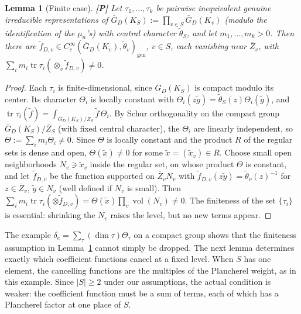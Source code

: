 \documentclass[12pt]{article}
\newcommand{\ov}[1]{\overline{#1}}
\newcommand{\gen}{\mathrm{gen}}
\newcommand{\tr}{\operatorname{tr}}
\newcommand{\vol}{\operatorname{vol}}
\newcommand{\Zb}{\ov{Z}}
\newcommand{\GDb}{\ov{G}_D}
\newcommand{\Pv}{\textbf{[P]}}
\theoremstyle{plain}
\newtheorem{lemma}[theorem]{Lemma}
\theoremstyle{definition}
\begin{document}
\begin{lemma}[Finite case]\label{lem:noncancel}\Pv
Let $\tau_1,\dots,\tau_k$ be pairwise inequivalent genuine irreducible representations of $\GDb(K_S):=\prod_{v\in S}\GDb(K_v)$ (modulo the identification of the $\mu_n$'s) with central character $\tilde\theta_S$, and let $m_1,\dots,m_k>0$. Then there are $\tilde f_{D,v}\in C_c^\infty(\GDb(K_v),\tilde\theta_v)_\gen$, $v\in S$, each vanishing near $\Zb_v$, with $\sum_im_i\tr\tau_i(\otimes_v\tilde f_{D,v})\ne0$.
\end{lemma}
\begin{proof}
Each $\tau_i$ is finite-dimensional, since $\GDb(K_S)$ is compact modulo its center. Its character $\Theta_i$ is locally constant with $\Theta_i(z\tilde g)=\tilde\theta_S(z)\Theta_i(\tilde g)$, and $\tr\tau_i(\tilde f)=\int_{\GDb(K_S)/\Zb_S}\tilde f\,\Theta_i$. By Schur orthogonality on the compact group $\GDb(K_S)/\Zb_S$ (with fixed central character), the $\Theta_i$ are linearly independent, so $\Theta:=\sum_im_i\Theta_i\ne0$. Since $\Theta$ is locally constant and the product $R$ of the regular sets is dense and open, $\Theta(\tilde x)\ne0$ for some $\tilde x=(\tilde x_v)\in R$. Choose small open neighborhoods $N_v\ni\tilde x_v$ inside the regular set, on whose product $\Theta$ is constant, and let $\tilde f_{D,v}$ be the function supported on $\Zb_vN_v$ with $\tilde f_{D,v}(z\tilde y)=\tilde\theta_v(z)^{-1}$ for $z\in\Zb_v$, $\tilde y\in N_v$ (well defined if $N_v$ is small). Then $\sum_im_i\tr\tau_i(\otimes\tilde f_{D,v})=\Theta(\tilde x)\prod_v\vol(N_v)\ne0$. The finiteness of the set $\{\tau_i\}$ is essential: shrinking the $N_v$ raises the level, but no new terms appear.
\end{proof}

The example $\delta_e=\sum_\tau(\dim\tau)\Theta_\tau$ on a compact group shows that the finiteness assumption in Lemma~\ref{lem:noncancel} cannot simply be dropped. The next lemma determines exactly which coefficient functions cancel at a fixed level. When $S$ has one element, the cancelling functions are the multiples of the Plancherel weight, as in this example. Since $|S|\ge2$ under our assumptions, the actual condition is weaker: the coefficient function must be a sum of terms, each of which has a Plancherel factor at one place of $S$.
\end{document}
